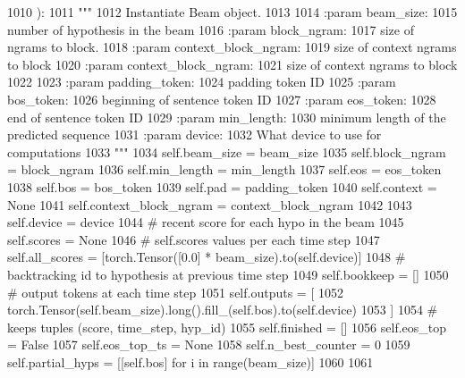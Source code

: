 \begin{DoxyCode}
1010     ):
1011         \textcolor{stringliteral}{"""}
1012 \textcolor{stringliteral}{        Instantiate Beam object.}
1013 \textcolor{stringliteral}{}
1014 \textcolor{stringliteral}{        :param beam\_size:}
1015 \textcolor{stringliteral}{            number of hypothesis in the beam}
1016 \textcolor{stringliteral}{        :param block\_ngram:}
1017 \textcolor{stringliteral}{            size of ngrams to block.}
1018 \textcolor{stringliteral}{        :param context\_block\_ngram:}
1019 \textcolor{stringliteral}{            size of context ngrams to block}
1020 \textcolor{stringliteral}{        :param context\_block\_ngram:}
1021 \textcolor{stringliteral}{            size of context ngrams to block}
1022 \textcolor{stringliteral}{}
1023 \textcolor{stringliteral}{        :param padding\_token:}
1024 \textcolor{stringliteral}{            padding token ID}
1025 \textcolor{stringliteral}{        :param bos\_token:}
1026 \textcolor{stringliteral}{            beginning of sentence token ID}
1027 \textcolor{stringliteral}{        :param eos\_token:}
1028 \textcolor{stringliteral}{            end of sentence token ID}
1029 \textcolor{stringliteral}{        :param min\_length:}
1030 \textcolor{stringliteral}{            minimum length of the predicted sequence}
1031 \textcolor{stringliteral}{        :param device:}
1032 \textcolor{stringliteral}{            What device to use for computations}
1033 \textcolor{stringliteral}{        """}
1034         self.beam\_size = beam\_size
1035         self.block\_ngram = block\_ngram
1036         self.min\_length = min\_length
1037         self.eos = eos\_token
1038         self.bos = bos\_token
1039         self.pad = padding\_token
1040         self.context = \textcolor{keywordtype}{None}
1041         self.context\_block\_ngram = context\_block\_ngram
1042 
1043         self.device = device
1044         \textcolor{comment}{# recent score for each hypo in the beam}
1045         self.scores = \textcolor{keywordtype}{None}
1046         \textcolor{comment}{# self.scores values per each time step}
1047         self.all\_scores = [torch.Tensor([0.0] * beam\_size).to(self.device)]
1048         \textcolor{comment}{# backtracking id to hypothesis at previous time step}
1049         self.bookkeep = []
1050         \textcolor{comment}{# output tokens at each time step}
1051         self.outputs = [
1052             torch.Tensor(self.beam\_size).long().fill\_(self.bos).to(self.device)
1053         ]
1054         \textcolor{comment}{# keeps tuples (score, time\_step, hyp\_id)}
1055         self.finished = []
1056         self.eos\_top = \textcolor{keyword}{False}
1057         self.eos\_top\_ts = \textcolor{keywordtype}{None}
1058         self.n\_best\_counter = 0
1059         self.partial\_hyps = [[self.bos] \textcolor{keywordflow}{for} i \textcolor{keywordflow}{in} range(beam\_size)]
1060 
1061 
\end{DoxyCode}


